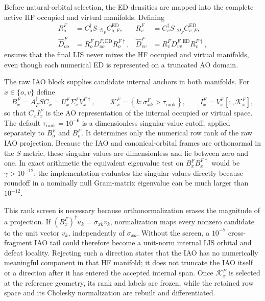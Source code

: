 \documentclass[11pt]{article}
\begin{document}
Before natural-orbital selection, the ED densities are mapped into the
complete active HF occupied and virtual manifolds.  Defining
\begin{align}
 R_o^F&=C_o^\dagger S_{:\mathcal D_F}C_{o,F}^{\mathrm{ED}}, &
 R_v^F&=C_v^\dagger S_{:\mathcal D_F}C_{v,F}^{\mathrm{ED}},\\
 \widehat D_{oo}^F&=R_o^FD_{oo}^{F,\mathrm{ED}}R_o^{F\dagger}, &
 \widehat D_{vv}^F&=R_v^FD_{vv}^{F,\mathrm{ED}}R_v^{F\dagger},
 \label{eq:iao-lis-global-density}
\end{align}
ensures that the final LIS never mixes the HF occupied and virtual manifolds,
even though each numerical ED is represented on a truncated AO domain.

The raw IAO block supplies candidate internal anchors in both manifolds.  For
$x\in\{o,v\}$ define
\begin{equation}
 B_x^F=A_F^\dagger SC_x
      =U_x^F\Sigma_x^F V_x^{F\dagger},
 \qquad
 \mathcal K_x^F=
 \left\{k:\sigma_{xk}^F>\tau_{\mathrm{rank}}\right\},
 \qquad
 I_x^F=V_x^F[:,\mathcal K_x^F],
 \label{eq:iao-lis-internal-anchors}
\end{equation}
so that $C_xI_x^F$ is the AO representation of the internal occupied or
virtual space.  The default
$\tau_{\mathrm{rank}}=10^{-6}$ is a dimensionless singular-value cutoff,
applied separately to $B_o^F$ and $B_v^F$.  It determines only the numerical
row rank of the raw IAO projection.  Because the IAO and canonical-orbital
frames are orthonormal in the $S$ metric, these singular values are
dimensionless and lie between zero and one.  In exact arithmetic the equivalent
eigenvalue test on $B_x^FB_x^{F\dagger}$ would be
$\gamma>10^{-12}$; the implementation evaluates the singular values
directly because roundoff in a nominally null Gram-matrix eigenvalue can be
much larger than $10^{-12}$.

This rank screen is necessary because orthonormalization erases the magnitude
of a projection.  If
$(B_x^F)^\dagger u_k=\sigma_{xk}v_k$, normalization maps every nonzero
candidate to the unit vector $v_k$, independently of $\sigma_{xk}$.  Without
the screen, a $10^{-7}$ cross-fragment IAO tail could therefore become a
unit-norm internal LIS orbital and defeat locality.  Rejecting such a
direction states that the IAO has no numerically meaningful component in
that HF manifold; it does not truncate the IAO itself or a direction after it
has entered the accepted internal span.  Once $\mathcal K_x^F$ is selected at
the reference geometry, its rank and labels are frozen, while the retained
row space and its Cholesky normalization are rebuilt and differentiated.
\end{document}
